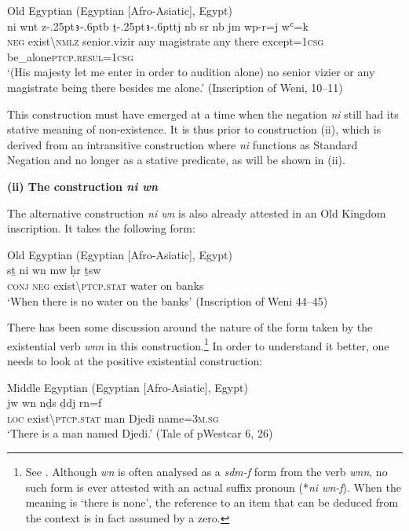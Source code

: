 \documentclass[output=paper]{langsci/langscibook}
\newcommand{\ꜥ}{ʿ}
\newcommand{\ꜣ}{\kern-.25pt\texttt{ꜣ}\kern-.6pt}
\begin{document}
\ea Old Egyptian (Egyptian [Afro-Asiatic], Egypt) \label{ex:AE22}\\
    \gll ni wnt z{\ꜣ}b ṯ{\ꜣ}tj nb sr nb jm wp-r=j  w{\ꜥ}=k \\
    \textsc{neg} exist\textbackslash\textsc{nmlz} senior.vizir any magistrate any there except=\textsc{1csg} be\_alone\textsc{ptcp.resul=1csg}\\ 
    \glt ‘(His majesty let me enter in order to audition alone) no senior vizier or any magistrate being there besides me alone.’ (Inscription of Weni, 10–11) 
\z 


This construction must have emerged at a time when the negation \textit{ni} still had its stative meaning of non-existence. It is thus prior to construction (ii), which is derived from an intransitive construction where \textit{ni} functions as Standard Negation and no longer as a stative predicate, as will be shown in (ii). 


\medskip
\noindent
\textbf{(ii) The construction \textit{ni wn}} 


The alternative construction \textit{ni wn} is also already attested in an Old Kingdom inscription. It takes the following form: 

\ea Old Egyptian (Egyptian [Afro-Asiatic], Egypt) \label{ex:AE23}\\
    \gll sṯ ni wn mw ḥr ṯsw\\
    \textsc{conj} \textsc{neg} exist\textbackslash\textsc{ptcp.stat} water on banks\\ 
    \glt ‘When there is no water on the banks’ (Inscription of Weni 44–45) 
\z

There has been some discussion around the nature of the form taken by the existential verb \textit{wnn} in this construction.\footnote{See \citet{Meltzer1990}. Although \textit{wn} is often analysed as a \textit{sdm-f} form from the verb \textit{wnn}, no such form is ever attested with an actual suffix pronoun (*\textit{ni wn-f}). When the meaning is ‘there is none’, the reference to an item that can be deduced from the context is in fact assumed by a zero. } In order to understand it better, one needs to look at the positive existential construction:  
 
\ea Middle Egyptian (Egyptian [Afro-Asiatic], Egypt) \label{ex:AE24}\\
    \gll jw wn nḏs ḏdj rn=f\\
    \textsc{loc} exist\textbackslash\textsc{ptcp.stat} man Djedi name=\textsc{3m.sg}\\ 
    \glt ‘There is a man named Djedi.’ (Tale of pWestcar 6, 26) 
\z 
 
\end{document}
